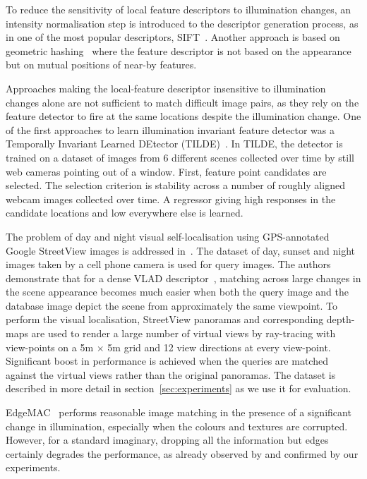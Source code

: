 To reduce the sensitivity of local feature descriptors to illumination changes, an intensity normalisation step is introduced to the descriptor generation process, as in one of the most popular descriptors, SIFT~\cite{Lowe-IJCV04}. Another approach is based on geometric hashing~\cite{Lamdan-ICCV88,Chum-CVPR06} where the feature descriptor is not based on the appearance but on mutual positions of near-by features. 

Approaches making the local-feature descriptor insensitive to illumination changes alone are not sufficient to match difficult image pairs, as they rely on the feature detector to fire at the same locations despite the illumination change. One of the first approaches to learn illumination invariant feature detector was a Temporally Invariant Learned DEtector (TILDE)~\cite{Verdie-CVPR15}. In TILDE, the detector is trained on a dataset of images from 6 different scenes collected over time by still web cameras pointing out of a window. First, feature point candidates are selected. The selection criterion is stability across a number of roughly aligned webcam images collected over time. A regressor giving high responses in the candidate locations and low everywhere else is learned. 

The problem of day and night visual self-localisation using GPS-annotated Google StreetView images is addressed in~\cite{Torii-CVPR2015}.
The \Tokyo dataset of day, sunset and night images taken by a cell phone camera is used for query images. The authors demonstrate that for a dense VLAD descriptor~\cite{Jegou-CVPR10}, matching across large changes in the scene appearance becomes much easier when both the query image and the database image depict the scene from approximately the same viewpoint. To perform the visual localisation, StreetView panoramas and corresponding depth-maps are used to render a large number of virtual views by ray-tracing with view-points on a 5m $\times$ 5m grid and 12 view directions at every view-point. Significant boost in performance is achieved when the queries are matched against the virtual views rather than the original panoramas.
The \Tokyo dataset is described in more detail in section~\ref{sec:experiments} as we use it for evaluation.

EdgeMAC~\cite{Radenovic-ECCV18} performs reasonable image matching in the presence of a significant change in illumination, especially when the colours and textures are corrupted. However, for a standard imaginary, dropping all the information but edges certainly degrades the performance, as already observed by \cite{Radenovic-ECCV18} and confirmed by our experiments.

